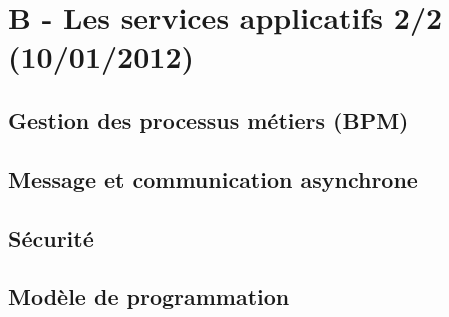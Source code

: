 \section{B - Les services applicatifs 2/2 (10/01/2012)}
\subsection{Gestion des processus métiers (BPM)}

\subsection{Message et communication asynchrone}

\subsection{Sécurité}
\subsection{Modèle de programmation}

